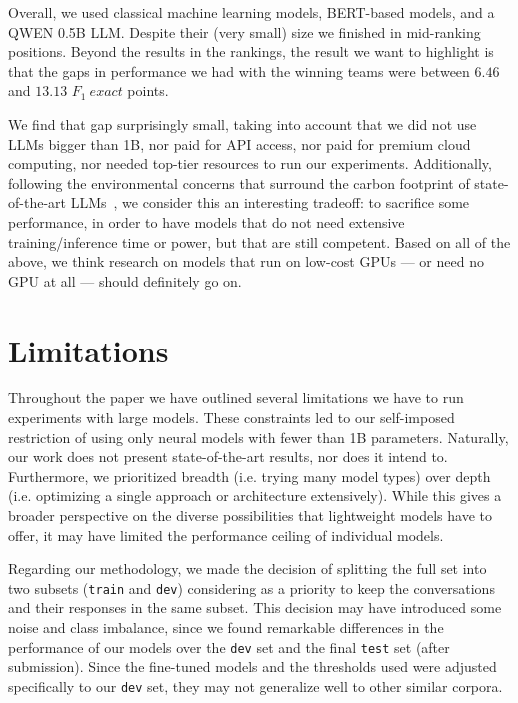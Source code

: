 \documentclass[11pt]{article}
\begin{document}
Overall, we used classical machine learning models, BERT-based models, and a QWEN 0.5B LLM.
Despite their (very small) size we finished in mid-ranking positions.
Beyond the results in the rankings, the result we want to highlight is that the gaps in performance we had with the winning teams were between $6.46$ and $13.13$ $F_1\ exact$ points.

We find that gap surprisingly small, taking into account that we did not use LLMs bigger than 1B, nor paid for API access, nor paid for premium cloud computing, nor needed top-tier resources to run our experiments.
Additionally, following the environmental concerns that surround the carbon footprint of state-of-the-art LLMs~\citep{luccioni2023estimating,faizllmcarbon,liu2024green}, we consider this an interesting tradeoff: to sacrifice some performance, in order to have models that do not need extensive training/inference time or power, but that are still competent.
Based on all of the above, we think research on models that run on low-cost GPUs --- or need no GPU at all --- should definitely go on.




\section{Limitations}
\label{sec:limitations}

Throughout the paper we have outlined several limitations we have to run experiments with large models.
These constraints led to our self-imposed restriction of using only neural models with fewer than 1B parameters.
Naturally, our work does not present state-of-the-art results, nor does it intend to. 
Furthermore, we prioritized breadth (i.e. trying many model types) over depth (i.e. optimizing a single approach or architecture extensively). 
While this gives a broader perspective on the diverse possibilities that lightweight models have to offer, it may have limited the performance ceiling of individual models.

Regarding our methodology, we made the decision of splitting the full set into two subsets (\texttt{train} and \texttt{dev}) considering as a priority to keep the conversations and their responses in the same subset.
This decision may have introduced some noise and class imbalance, since we found remarkable differences in the performance of our models over the \texttt{dev} set and the final \texttt{test} set (after submission).
Since the fine-tuned models and the thresholds used were adjusted specifically to our \texttt{dev} set, they may not generalize well to other similar corpora. 
\end{document}
